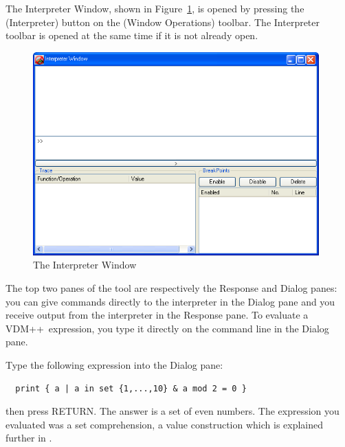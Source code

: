 \documentclass[\pformat,12pt]{article}
\newcommand{\vdmslpp}{VDM++}
\newcommand{\guicmd}[1]{{\sf #1}}
\begin{document}
The \guicmd{Interpreter Window}, shown in
Figure~\ref{fig:interpwin}, is opened by pressing the 
(\guicmd{Interpreter}) button on the (\guicmd{Window Operations})
toolbar. The \guicmd{Interpreter} toolbar is opened at the same
time if it is not already open.



\begin{figure}[tbh]
\begin{center}
\includegraphics[width=11cm]{interpreterWindowENG.png}
\caption{The Interpreter Window}
\label{fig:interpwin}
\end{center}
\end{figure}

The top two panes of the tool are respectively the
\guicmd{Response} and \guicmd{Dialog} panes: you
can give commands directly to the interpreter in the
\guicmd{Dialog} pane and you receive output from the
interpreter in the \guicmd{Response} pane. To evaluate a \vdmslpp\
expression, you type it directly on the command line in the
\guicmd{Dialog} pane.

Type the following expression into the \guicmd{Dialog} pane:


\begin{verbatim}
  print { a | a in set {1,...,10} & a mod 2 = 0 }
\end{verbatim}

then press RETURN.  The answer is a set of even
numbers. The expression you evaluated was a set comprehension, a value
construction which is explained further in
.
\end{document}
